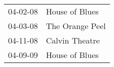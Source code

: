 \begin{supertabular}{p{0.07\textwidth}p{0.23\textwidth}}
 04-02-08 &   House of Blues \\
 04-03-08 &  The Orange Peel \\
 04-11-08 &   Calvin Theatre \\
 04-09-09 &   House of Blues \\
\end{supertabular}
